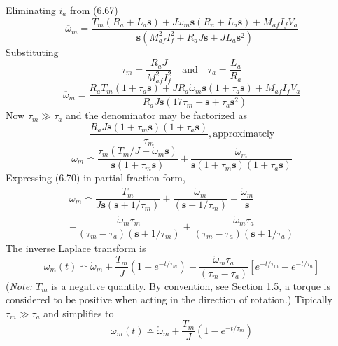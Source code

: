 \documentclass[a4paper,numbers=noenddot,12pt]{scrbook}
\begin{document}
    Eliminating $\bar i_a$ from (6.67) %
    \begin{equation}
        \overline \omega_m = \dfrac{T_m (R_a + L_a \mathbf{s}) + J \mathring \omega_m \mathbf{s}(R_a + L_a \mathbf{s}) + M_{af} I_f V_a}{\mathbf{s}(M_{af}^2 I_f^2 + R_a J \mathbf{s} + J L_a \mathbf{s}^2)}
        \label{eq:Eq6.68}
    \end{equation}
    Substituting
    \begin{equation*}
        \tau_m = \dfrac{R_a J}{M_{af}^2 I_f^2} \quad \text{and} \quad \tau_a = \dfrac{L_a}{R_a}
        \label{}
    \end{equation*}
    \begin{equation}
        \overline \omega_m = \dfrac{R_a T_m (1 + \tau_a \mathbf{s}) + J R_a \mathring \omega_m \mathbf{s}(1 + \tau_a \mathbf{s}) + M_{af} I_f V_a}{R_a J \mathbf{s}(17\tau_m + \mathbf{s} + \tau_a \mathbf{s}^2)}
        \label{eq:Eq6.69}
    \end{equation}
    Now $\tau_m \gg \tau_a$ and the denominator may be factorized as
    \begin{equation*}
        \dfrac{R_a J \mathbf{s}(1 + \tau_m \mathbf{s})(1 + \tau_a \mathbf{s})}{\tau_m},\text{approximately}
        \label{}
    \end{equation*}
    \begin{equation}
        \overline \omega_m \bumpeq \dfrac{\tau_m (T_m/J + \mathring \omega_m \mathbf{s})}{\mathbf{s}(1 + \tau_m \mathbf{s})} + \dfrac{\mathring \omega_m}{\mathbf{s}(1 + \tau_m \mathbf{s})(1 + \tau_a \mathbf{s})}
        \label{eq:Eq6.70}
    \end{equation}
    Expressing (6.70) in partial fraction form,
    \begin{multline}
        \overline \omega_m \bumpeq \dfrac{T_m}{J \mathbf{s}(\mathbf{s} + 1 / \tau_m)} + \dfrac{\mathring \omega_m}{(\mathbf{s} + 1 / \tau_m)} + \dfrac{\mathring \omega_m}{\mathbf{s}} \\
        - \dfrac{\mathring \omega_m \tau_m}{(\tau_m - \tau_a)(\mathbf{s} + 1 / \tau_m)} + \dfrac{\mathring\omega_m \tau_a}{(\tau_m - \tau_a)(\mathbf{s} + 1 / \tau_a)}
        \label{eq:Eq6.71}
    \end{multline}
    The inverse Laplace transform is
    \begin{equation}
        \omega_m(t) \bumpeq \mathring \omega_m + \dfrac{T_m}{J} (1 - e^{-t/\tau_m}) - \dfrac{\mathring \omega_m \tau_a}{(\tau_m - \tau_a)}[e^{-t/\tau_m} - e^{-t / \tau_a}]
        \label{}
    \end{equation}
    (\textit{Note:} $T_m$ is a negative quantity. By convention, see Section 1.5, a torque is considered to be positive when acting in the direction of rotation.)
    Tipically $\tau_m \gg \tau_a$ and simplifies to
    \begin{equation}
        \omega_m(t) \bumpeq \mathring \omega_m + \dfrac{T_m}{J}(1 - e^{-t/\tau_m})
        \label{eq:Eq6.73}
    \end{equation}
\end{document}
